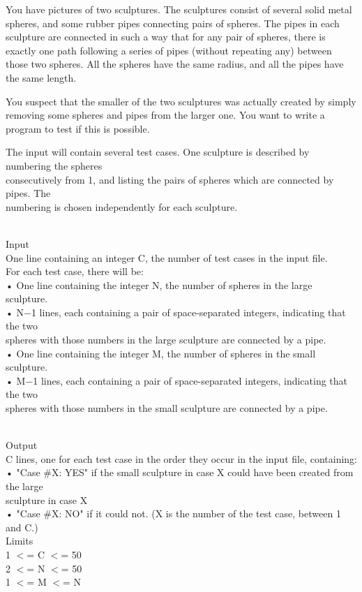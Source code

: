 



   You have pictures of two sculptures. The sculptures consist of several solid metal spheres, and some rubber pipes connecting pairs of spheres. The pipes in each sculpture are connected in such a way that for any pair of spheres, there is exactly one path following a series of pipes (without repeating any) between those two spheres. All the spheres have the same radius, and all the pipes have the same length.  

   You suspect that the smaller of the two sculptures was actually created by simply removing some spheres and pipes from the larger one. You want to write a program to test if this is possible.  

   The input will contain several test cases. One sculpture is described by numbering the spheres   
\\   consecutively from 1, and listing the pairs of spheres which are connected by pipes. The   
\\   numbering is chosen independently for each sculpture.  


\\   Input   
\\   One line containing an integer C, the number of test cases in the input file.   
\\   For each test case, there will be:   
\\   • One line containing the integer N, the number of spheres in the large sculpture.   
\\   • N−1 lines, each containing a pair of space-separated integers, indicating that the two   
\\   spheres with those numbers in the large sculpture are connected by a pipe.   
\\   • One line containing the integer M, the number of spheres in the small sculpture.   
\\   • M−1 lines, each containing a pair of space-separated integers, indicating that the two   
\\   spheres with those numbers in the small sculpture are connected by a pipe.  


\\   Output   
\\   C lines, one for each test case in the order they occur in the input file, containing:   
\\   • "Case \#X: YES" if the small sculpture in case X could have been created from the large   
\\   sculpture in case X   
\\   • "Case \#X: NO" if it could not. (X is the number of the test case, between 1 and C.)   
\\   Limits   
\\   1 $<$= C $<$= 50   
\\   2 $<$= N $<$= 50   
\\   1 $<$= M $<$= N  

